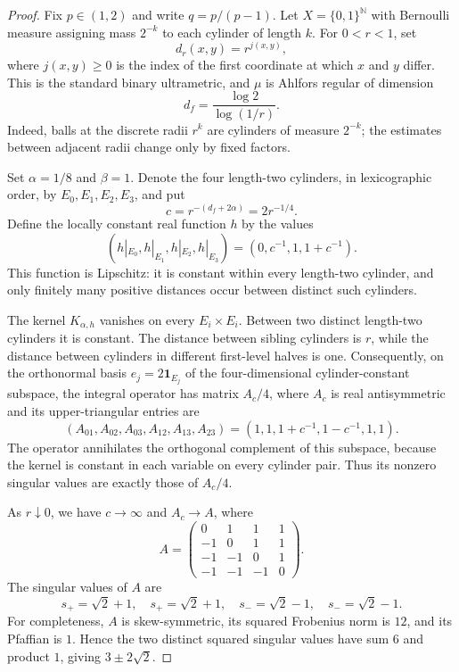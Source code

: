 \documentclass[11pt]{article}
\begin{document}
\begin{proof}
Fix $p\in(1,2)$ and write $q=p/(p-1)$.  Let
$X=\{0,1\}^{\mathbb N}$ with Bernoulli measure assigning mass $2^{-k}$ to
each cylinder of length $k$.  For $0<r<1$, set
\[
 d_r(x,y)=r^{j(x,y)},
\]
where $j(x,y)\geq0$ is the index of the first coordinate at which $x$ and
$y$ differ.  This is the standard binary ultrametric, and $\mu$ is Ahlfors
regular of dimension
\[
 d_f=\frac{\log2}{\log(1/r)}.
\]
Indeed, balls at the discrete radii $r^k$ are cylinders of measure $2^{-k}$;
the estimates between adjacent radii change only by fixed factors.

Set $\alpha=1/8$ and $\beta=1$.  Denote the four length-two cylinders, in
lexicographic order, by $E_0,E_1,E_2,E_3$, and put
\[
 c=r^{-(d_f+2\alpha)}=2r^{-1/4}.
\]
Define the locally constant real function $h$ by the values
\begin{equation}\label{eq:hvalues}
 (h|_{E_0},h|_{E_1},h|_{E_2},h|_{E_3})
   =(0,c^{-1},1,1+c^{-1}).
\end{equation}
This function is Lipschitz: it is constant within every length-two cylinder,
and only finitely many positive distances occur between distinct such
cylinders.

The kernel $K_{\alpha,h}$ vanishes on every $E_i\times E_i$.  Between two
distinct length-two cylinders it is constant.  The distance between sibling
cylinders is $r$, while the distance between cylinders in different
first-level halves is one.  Consequently, on the orthonormal basis
$e_j=2\mathbf1_{E_j}$ of the four-dimensional cylinder-constant subspace,
the integral operator has matrix $A_c/4$, where $A_c$ is real antisymmetric
and its upper-triangular entries are
\begin{equation}\label{eq:Ac}
 (A_{01},A_{02},A_{03},A_{12},A_{13},A_{23})
  =(1,1,1+c^{-1},1-c^{-1},1,1).
\end{equation}
The operator annihilates the orthogonal complement of this subspace, because
the kernel is constant in each variable on every cylinder pair.  Thus its
nonzero singular values are exactly those of $A_c/4$.

As $r\downarrow0$, we have $c\to\infty$ and $A_c\to A$, where
\begin{equation}\label{eq:A}
 A=\begin{pmatrix}
 0&1&1&1\\
 -1&0&1&1\\
 -1&-1&0&1\\
 -1&-1&-1&0
 \end{pmatrix}.
\end{equation}
The singular values of $A$ are
\[
 s_+=\sqrt2+1,\quad s_+=\sqrt2+1,\quad
 s_-=\sqrt2-1,\quad s_-=\sqrt2-1.
\]
For completeness, $A$ is skew-symmetric, its squared Frobenius norm is $12$,
and its Pfaffian is $1$.  Hence the two distinct squared singular values have
sum $6$ and product $1$, giving $3\pm2\sqrt2$.


\end{proof}
\end{document}
